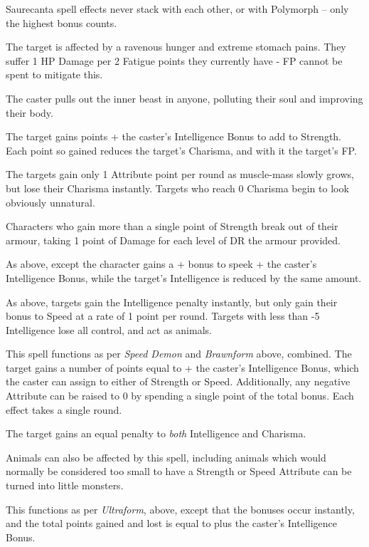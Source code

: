 	Saurecanta spell effects never stack with each other, or with Polymorph -- only the highest bonus counts.

\spelllevel
{}
The target is affected by a ravenous hunger and extreme stomach pains.  They suffer 1 HP Damage per 2 Fatigue points they currently have - FP cannot be spent to mitigate this.

\spelllevel
{}
The caster pulls out the inner beast in anyone, polluting their soul and improving their body.

The target gains  points + the caster's Intelligence Bonus to add to Strength.  Each point so gained reduces the target's Charisma, and with it the target's FP.

The targets gain only 1 Attribute point per round as muscle-mass slowly grows, but lose their Charisma instantly.  Targets who reach 0 Charisma begin to look obviously unnatural.

Characters who gain more than a single point of Strength break out of their armour, taking 1 point of Damage for each level of DR the armour provided.

As above, except the character gains a + bonus to speek + the caster's Intelligence Bonus, while the target's Intelligence is reduced by the same amount.

As above, targets gain the Intelligence penalty instantly, but only gain their bonus to Speed at a rate of 1 point per round.  Targets with less than -5 Intelligence lose all control, and act as animals.

\spelllevel
{}
This spell functions as per {\it Speed Demon} and {\it Brawnform} above, combined.  The target gains a number of points equal to  + the caster's Intelligence Bonus, which the caster can assign to either of Strength or Speed.  Additionally, any negative Attribute can be raised to 0 by spending a single point of the total bonus.  Each effect takes a single round.

The target gains an equal penalty to {\it both} Intelligence and Charisma.

Animals can also be affected by this spell, including animals which would normally be considered too small to have a Strength or Speed Attribute can be turned into little monsters.

\spelllevel
{}
This functions as per {\it Ultraform}, above, except that the bonuses occur instantly, and the total points gained and lost is equal to  plus the caster's Intelligence Bonus.

